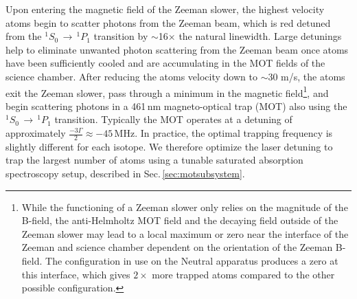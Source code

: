 Upon entering the magnetic field of the Zeeman slower, the highest velocity atoms begin to scatter photons from the Zeeman beam, which is red detuned from the $^1S_0\,\rightarrow\,^1P_1$ transition by $\sim$16$\times$ the natural linewidth.
Large detunings help to eliminate unwanted photon scattering from the Zeeman beam once atoms have been sufficiently cooled and are accumulating in the MOT fields of the science chamber. 
After reducing the atoms velocity down to $\sim$30 m/s, the atoms exit the Zeeman slower, pass through a minimum in the magnetic field\footnote{
While the functioning of a Zeeman slower only relies on the magnitude of the B-field, the anti-Helmholtz MOT field and the decaying field outside of the Zeeman slower may lead to a local maximum or zero near the interface of the Zeeman and science chamber dependent on the orientation of the Zeeman B-field.
The configuration in use on the Neutral apparatus produces a zero at this interface, which gives $2\times$ more trapped atoms compared to the other possible configuration.}, and begin scattering photons in a 461\,nm magneto-optical trap (MOT) also using the $^1S_0\,\rightarrow\,^1P_1$ transition. 
Typically the MOT operates at a detuning of approximately $\frac{-3\Gamma}{2} \approx -45\,$MHz. 
In practice, the optimal trapping frequency is slightly different for each isotope.
We therefore optimize the laser detuning to trap the largest number of atoms using a tunable saturated absorption spectroscopy setup, described in Sec.\,\ref{sec:motsubsystem}. 



